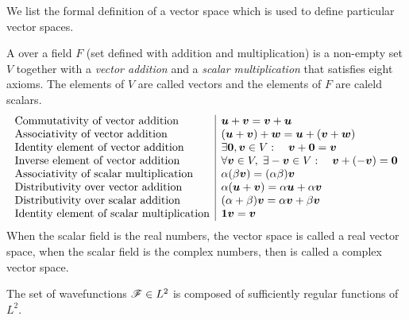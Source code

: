 We list the formal definition of a vector space which is used to define particular vector spaces.
\begin{definition}
    A  over a field $F$ (set defined with addition and multiplication) is a non-empty set $V$ together with a \emph{vector addition} and a 
    \emph{scalar multiplication} that satisfies eight axioms. The elements of $V$ are called vectors and the elements of $F$ are caleld 
    scalars.
    \begin{align}
        \begin{array}{l|l}
            \text{Commutativity of vector addition}&\bm{u}+\bm{v}=\bm{v}+\bm{u}\\
            \text{Associativity of vector addition}&(\bm{u}+\bm{v})+\bm{w}=\bm{u}+(\bm{v}+\bm{w})\\
            \text{Identity element of vector addition}&\exists \bm{0},\bm{v}\in V:\quad\bm{v}+\bm{0}=\bm{v}\\
            \text{Inverse element of vector addition}&\forall \bm{v}\in V,\;\exists -\bm{v}\in V:\quad\bm{v}+(-\bm{v})=\bm{0}\\
            \text{Associativity of scalar multiplication}&\alpha(\beta\bm{v})=(\alpha\beta)\bm{v}\\
            \text{Distributivity over vector addition}&\alpha(\bm{u}+\bm{v})=\alpha\bm{u}+\alpha\bm{v}\\
            \text{Distributivity over scalar addition}&(\alpha+\beta)\bm{v}=\alpha\bm{v}+\beta\bm{v}\\
            \text{Identity element of scalar multiplication}&\bm{1}\bm{v}=\bm{v}
        \end{array}
    \end{align}
    When the scalar field is the real numbers, the vector space is called a real vector space, when the scalar field is the complex numbers, then is called a complex vector space.
\end{definition}

\begin{definition}
    The set of wavefunctions $\mathscr{F}\in L^2$ is composed of sufficiently regular functions of $L^2$.
\end{definition}
